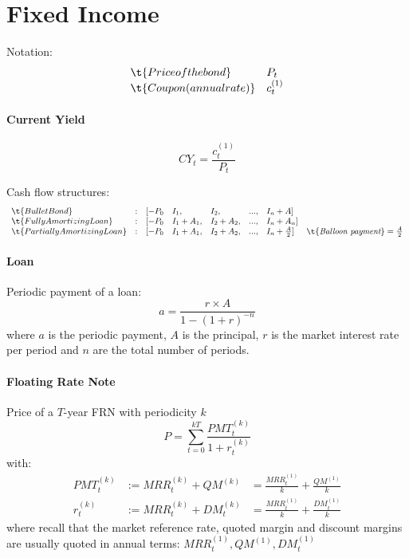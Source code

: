 \documentclass[12pt,article]{memoir}
\begin{document}
\chapter{Fixed Income}
Notation: 
$$\begin{array}{ll}
\t{Price of the bond} & P_t
\\
\t{Coupon (annual rate)} & c^{(1)}_t
\end{array}$$

\subsubsection{Current Yield}
$$CY_t = \frac{c^{(1)}_t}{P_t}$$

Cash flow structures: 
$$\begin{array}{llllllll}
\t{Bullet Bond} & : & [-P_0 & I_1, & I_2, &..., &I_n + A]
\\ 
\t{Fully Amortizing Loan} &:& [-P_0 & I_1+A_1, &I_2+A_2, &..., & I_n+A_n]
\\
\t{Partially Amortizing Loan} &:& [-P_0 & I_1+A_1, &I_2+A_2, &..., & I_n+\frac{A}{2}] & \t{\textit{Balloon payment}}=\frac{A}{2}
\end{array}$$

\subsubsection{Loan}
Periodic payment of a loan: 
$$
a = \frac{r \times A}{1-(1+r)^{-n}}
$$
where $a$ is the periodic payment, $A$ is the principal, $r$ is the market interest rate per period and $n$ are the total number of periods.
\subsubsection{Floating Rate Note}
Price of a $T$-year FRN with periodicity $k$
$$
P = \sum_{t=0}^{kT} \frac{PMT_t^{(k)}}{1+r_t^{(k)}}
$$
with:
$$\begin{array}{rlll}
PMT_t^{(k)} &:= MRR_t^{(k)} + QM^{(k)} &= \frac{MRR_t^{(1)}}{k} + \frac{QM^{(1)}}{k}
\\[0.7em]
r_t^{(k)}   &:= MRR_t^{(k)} + DM_t^{(k)} &= \frac{MRR_t^{(1)}}{k} + \frac{DM_t^{(1)}}{k}
\end{array}$$
where recall that the market reference rate, quoted margin and discount margins are usually quoted in annual terms: $MRR_t^{(1)}, QM^{(1)}, DM_t^{(1)}$
\end{document}
